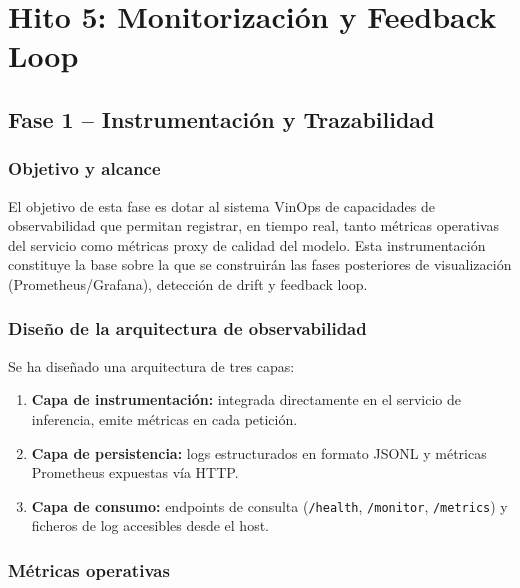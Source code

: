 
\section{Hito 5: Monitorización y Feedback Loop}

\subsection{Fase 1 -- Instrumentación y Trazabilidad}

\subsubsection{Objetivo y alcance}

El objetivo de esta fase es dotar al sistema VinOps de capacidades de observabilidad que permitan registrar, en tiempo real, tanto métricas operativas del servicio como métricas proxy de calidad del modelo. Esta instrumentación constituye la base sobre la que se construirán las fases posteriores de visualización (Prometheus/Grafana), detección de drift y feedback loop.

\subsubsection{Diseño de la arquitectura de observabilidad}

Se ha diseñado una arquitectura de tres capas:

\begin{enumerate}
    \item \textbf{Capa de instrumentación:} integrada directamente en el servicio de inferencia, emite métricas en cada petición.
    \item \textbf{Capa de persistencia:} logs estructurados en formato JSONL y métricas Prometheus expuestas vía HTTP.
    \item \textbf{Capa de consumo:} endpoints de consulta (\texttt{/health}, \texttt{/monitor}, \texttt{/metrics}) y ficheros de log accesibles desde el host.
\end{enumerate}

\subsubsection{Métricas operativas}

